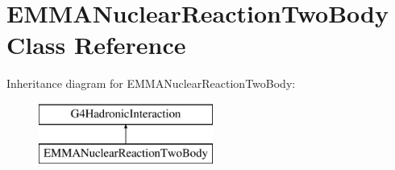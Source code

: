 \hypertarget{classEMMANuclearReactionTwoBody}{\section{E\-M\-M\-A\-Nuclear\-Reaction\-Two\-Body Class Reference}
\label{classEMMANuclearReactionTwoBody}
}
Inheritance diagram for E\-M\-M\-A\-Nuclear\-Reaction\-Two\-Body\-:\begin{figure}[H]
\begin{center}
\leavevmode
\includegraphics[height=2.000000cm]{classEMMANuclearReactionTwoBody}
\end{center}
\end{figure}
